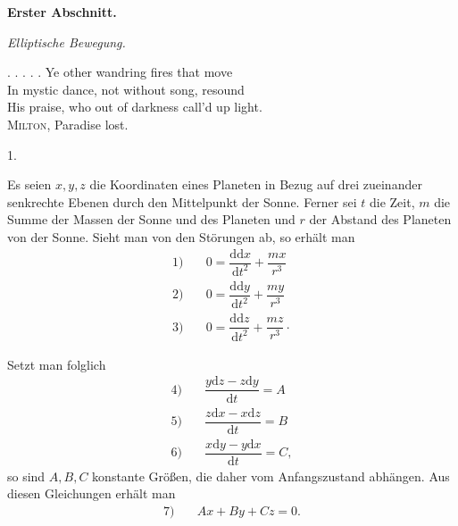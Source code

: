 \par{}\bigskip
{}
\begin{center}
{\large\bfseries Erster Abschnitt.\par}
\medskip\textit{Elliptische Bewegung.}
\end{center}
\begin{flushright}
\begin{minipage}{.94\textwidth}
\small\raggedright
. . . . . Ye other wandring fires that move\\
In mystic dance, not without song, resound\\
His praise, who out of darkness call’d up light.\\
\hspace*{2em}\textsc{Milton}, Paradise lost.
\end{minipage}
\end{flushright}
\begin{center}1.\end{center}
\noindent\hspace*{\parindent}Es seien \(x,y,z\) die Koordinaten eines Planeten in Bezug auf drei zueinander senkrechte Ebenen durch den Mittelpunkt der Sonne. Ferner sei \(t\) die Zeit, \(m\) die Summe der Massen der Sonne und des Planeten und \(r\) der Abstand des Planeten von der Sonne. Sieht man von den Störungen ab, so erhält man
\[
\begin{array}{rl}
1)\quad&0=\dfrac{\mathrm{dd}x}{\mathrm{d}t^2}+\dfrac{mx}{r^3}\\[5pt]
2)\quad&0=\dfrac{\mathrm{dd}y}{\mathrm{d}t^2}+\dfrac{my}{r^3}\\[5pt]
3)\quad&0=\dfrac{\mathrm{dd}z}{\mathrm{d}t^2}+\dfrac{mz}{r^3}\mathpunct{\cdot}
\end{array}
\]
\par Setzt man folglich
\[
\begin{array}{rl}
4)\quad&\dfrac{y\mathrm{d}z-z\mathrm{d}y}{\mathrm{d}t}=A\\[5pt]
5)\quad&\dfrac{z\mathrm{d}x-x\mathrm{d}z}{\mathrm{d}t}=B\\[5pt]
6)\quad&\dfrac{x\mathrm{d}y-y\mathrm{d}x}{\mathrm{d}t}=C,
\end{array}
\]
so sind \(A,B,C\) konstante Größen, die daher vom Anfangszustand abhängen. Aus diesen Gleichungen erhält man
\[
\begin{array}{rl}7)\quad&Ax+By+Cz=0.\end{array}
\]

